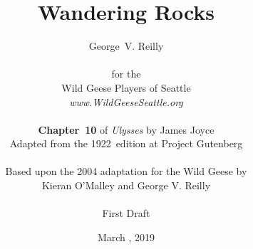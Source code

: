 


\title{\Huge Wandering Rocks}
\author{George~V. Reilly\\
\\
{\small for the}\\
Wild Geese Players of Seattle\\
{\textit{www.WildGeeseSeattle.org}}\\
\\
{\small \textbf{Chapter~10} of \textit{Ulysses} by James Joyce}\\
{\small Adapted from the 1922~edition at Project Gutenberg}
\\
\\
{\small Based upon the 2004 adaptation for the Wild Geese by}\\
{\small Kieran O'Malley and George V. Reilly}\\
\\
{\small First Draft}}
\date{March , 2019}
\raggedbottom



\maketitle
\thispagestyle{empty}
\pagebreak

